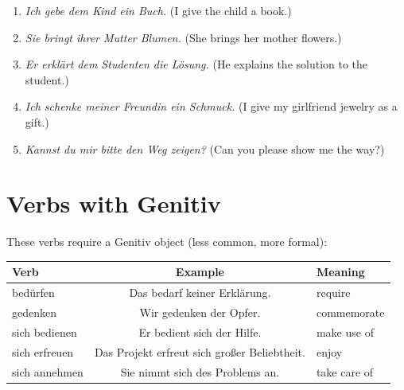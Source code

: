 \begin{enumerate}
    \item \textit{Ich gebe dem Kind ein Buch.} (I give the child a book.)
    \item \textit{Sie bringt ihrer Mutter Blumen.} (She brings her mother flowers.)
    \item \textit{Er erklärt dem Studenten die Lösung.} (He explains the solution to the student.)
    \item \textit{Ich schenke meiner Freundin ein Schmuck.} (I give my girlfriend jewelry as a gift.)
    \item \textit{Kannst du mir bitte den Weg zeigen?} (Can you please show me the way?)
\end{enumerate}

\section{Verbs with Genitiv}
\label{sec:GenitivVerben}

These verbs require a Genitiv object (less common, more formal):

\bigskip
\begin{center}
\begin{tabular}{|l|c|l|}
\hline
Verb & Example & Meaning \\ \hline
bedürfen & Das bedarf keiner Erklärung. & require \\ \hline
gedenken & Wir gedenken der Opfer. & commemorate \\ \hline
sich bedienen & Er bedient sich der Hilfe. & make use of \\ \hline
sich erfreuen & Das Projekt erfreut sich großer Beliebtheit. & enjoy \\ \hline
sich annehmen & Sie nimmt sich des Problems an. & take care of \\ \hline
\end{tabular}
\end{center}

\chapterend